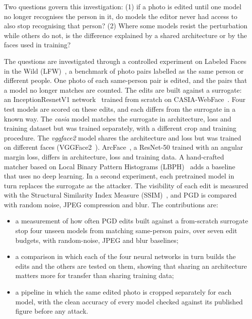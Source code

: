 \documentclass[conference]{IEEEtran}
\begin{document}
Two questions govern this investigation: (1) if a photo is edited until one model no longer recognises the person in it, do models the editor never had access to also stop recognising that person? 
(2) Where some models resist the perturbation while others do not, is the difference explained by a shared architecture or by the faces used in training?

The questions are investigated through a controlled experiment on Labeled Faces in the Wild
(LFW)~\cite{lfw}, a benchmark of photo pairs labelled as the same person or different people. One photo of each
same-person pair is edited, and the pairs that a model no longer matches are counted. The edits are built against a
surrogate: an InceptionResnetV1 network~\cite{inceptionv4} trained from scratch on CASIA-WebFace~\cite{casia}. Four
test models are scored on these edits, and each differs from the surrogate in a known way. The \emph{casia} model
matches the surrogate in architecture, loss and training dataset but was trained separately, with a different crop and
training procedure. The \emph{vggface2} model shares the architecture and loss but was trained on different faces
(VGGFace2~\cite{vggface2}). ArcFace~\cite{arcface}, a ResNet-50 trained with an angular margin loss, differs in
architecture, loss and training data. A hand-crafted matcher based on Local Binary Pattern Histograms
(LBPH)~\cite{lbph} adds a baseline that uses no deep learning. In a second experiment, each pretrained model in turn
replaces the surrogate as the attacker. The visibility of each edit is measured with the Structural Similarity Index
Measure (SSIM)~\cite{ssim}, and PGD is compared with random noise, JPEG
compression and blur. The contributions are:
\begin{itemize}
\item a measurement of how often PGD edits built against a from-scratch surrogate stop four unseen models from
matching same-person pairs, over seven edit budgets, with random-noise, JPEG and blur baselines;
\item a comparison in which each of the four neural networks in turn builds the edits and the others are tested on
them, showing that sharing an architecture matters more for transfer than sharing training data;
\item a pipeline in which the same edited photo is cropped separately for each model, with the clean accuracy of
every model checked against its published figure before any attack.
\end{itemize}
\end{document}
